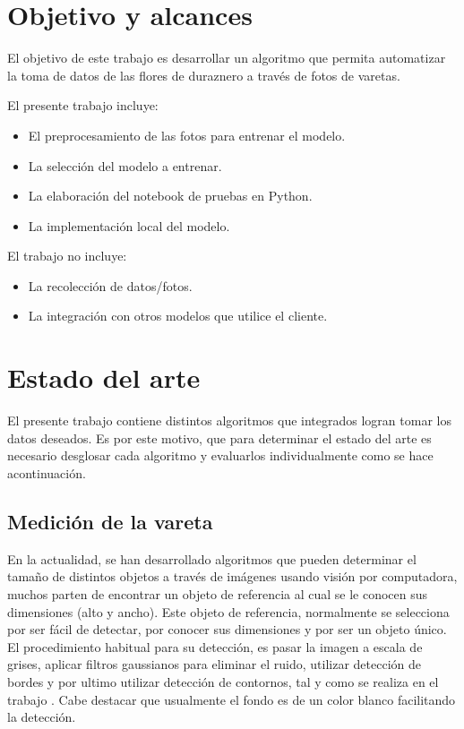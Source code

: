 \section{Objetivo y alcances}

El objetivo de este trabajo es desarrollar un algoritmo que permita automatizar la toma de datos de las flores de duraznero a través de fotos de varetas.

El presente trabajo incluye:
\begin{itemize}
	\item El preprocesamiento de las fotos para entrenar el modelo.
	\item La selección del modelo a entrenar.
	\item La elaboración del notebook de pruebas en Python.
	\item La implementación local del modelo.
\end{itemize}

El trabajo no incluye:
\begin{itemize}
	\item La recolección de datos/fotos.
	\item La integración con otros modelos que utilice el cliente.
\end{itemize}



\section{Estado del arte}

El presente trabajo contiene distintos algoritmos que integrados logran tomar los datos deseados. Es por este motivo, que para determinar el estado del arte es necesario desglosar cada algoritmo y evaluarlos individualmente como se hace acontinuación.

\subsection{Medición de la vareta}

En la actualidad, se han desarrollado algoritmos que pueden determinar el tamaño de distintos objetos a través de imágenes usando visión por computadora, muchos parten de encontrar un objeto de referencia al cual se le conocen sus dimensiones (alto y ancho). Este objeto de referencia, normalmente se selecciona por ser fácil de detectar, por conocer sus dimensiones y por ser un objeto único. El procedimiento habitual para su detección, es pasar la imagen a escala de grises, aplicar filtros gaussianos para eliminar el ruido, utilizar detección de bordes y por ultimo utilizar detección de contornos, tal y como se realiza en el trabajo \cite{ARTICLE:2}. Cabe destacar que usualmente el fondo es de un color blanco facilitando la detección.

